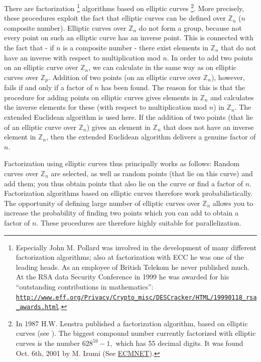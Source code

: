 There are factorization%
\footnote{Especially John M. Pollard  was involved
in the development of many different factorization algorithms; also at
factorization with ECC he was one of the leading heads. As an employee
of British Telekom he never published much. At the RSA data Security Conference
in 1999 he was awarded for his ``outstanding contributions in mathematics'':
\href{http://www.eff.org/Privacy/Crypto_misc/DESCracker/HTML/19990118_rsa_awards.html}
{\texttt{http://www.eff.org/Privacy/Crypto\_misc/DESCracker/HTML/19990118\_rsa\_awards.html}}.
}
algorithms based on elliptic curves%
\footnote{In 1987 H.W. Lenstra published
a factorization algorithm, based on elliptic curves (see \cite{ec:Lenstra1987}).
The biggest compound number currently 
factorized with elliptic curves is 
the number $ 628^{59}-1, $ which has 55 decimal digits. It was
found Oct. 6th, 2001 by M. Izumi 
(See \hyperlink{Lenstra2}{ECMNET}).
}. 
More precisely, these procedures exploit the fact that elliptic curves can
be defined over ${\mathbb Z}_n$ ($n$ composite number). Elliptic curves 
over ${\mathbb Z}_n$ do not form a group, because not every point on such 
an elliptic curve has an inverse point. This is connected with the fact 
that - if $n$ is a composite
number - there exist elements in ${\mathbb Z}_n$ that do not have an inverse
with respect to multiplication mod $n$. In order to add two points on an
elliptic curve over ${\mathbb Z}_n$, we can calculate in the same way as on
elliptic curves over ${\mathbb Z}_p$. Addition of two points (on an elliptic
curve over ${\mathbb Z}_n$), however, fails if and only if a factor of $n$ has
been found. The reason for this is that the procedure for adding points on
elliptic curves gives elements in ${\mathbb Z}_n$ and calculates the inverse
elements for these (with respect to multiplication mod $n$) in ${\mathbb Z}_n$.
The extended  Euclidean algorithm is used here. If
the addition of two points (that lie of an elliptic curve over ${\mathbb Z}_n$)
gives an element in ${\mathbb Z}_n$ that does not have an inverse element in
${\mathbb Z}_n$, then the extended Euclidean algorithm delivers a genuine factor
of $n$.

Factorization using elliptic curves thus principally works as follows: 
Random curves over ${\mathbb Z}_n$ are selected, as well as random points
(that lie on this curve) and add them; you thus obtain points that also
lie on the curve or find a factor of $n$. 
Factorization algorithms based on elliptic curves
therefore work probabilistically. The opportunity of defining large number of
elliptic curves over ${\mathbb Z}_n$ allows you to increase the probability of
finding two points which you can add to obtain a factor of $n$. These procedures
are therefore highly suitable for parallelization.



